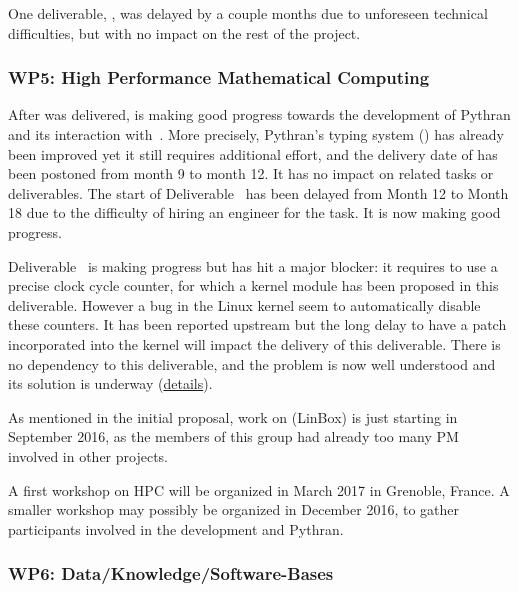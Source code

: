 \documentclass{deliverablereport}
\begin{document}
One deliverable, , was delayed by a
couple months due to unforeseen technical difficulties, but with no
impact on the rest of the project.

\subsubsection{WP5: High Performance Mathematical Computing}

After  was delivered,
 is making good progress towards the
development of Pythran and its interaction with~\Sage.  More
precisely, Pythran's typing system ()
has already been improved
yet it still requires additional effort, and the delivery date of
 has been postoned from month 9 to month
12. It has no impact on related tasks or deliverables. The start of
Deliverable~ has been delayed from Month
12 to Month 18 due to the difficulty of hiring an engineer for the
task. It is now making good progress.

Deliverable~ is making
progress but has hit a major blocker: it requires to use a precise
clock cycle counter, for which a kernel module has been proposed in
this deliverable. However a bug in the Linux kernel seem to
automatically disable these counters. It has been reported upstream
but the long delay to have a patch incorporated into the kernel will
impact the delivery of this deliverable. There is no dependency to
this deliverable, and the problem is now well understood and its
solution is underway
(\href{https://github.com/OpenDreamKit/OpenDreamKit/issues/118}{details}).

As mentioned in the initial proposal, work on
 (LinBox) is just starting in September 2016,
as the members of this group had already too many PM involved in other
projects.

A first workshop on HPC will be organized in March 2017 in Grenoble,
France. A smaller workshop may possibly be organized in December 2016,
to gather participants involved in the development and Pythran.


\subsubsection{WP6: Data/Knowledge/Software-Bases }
\end{document}
